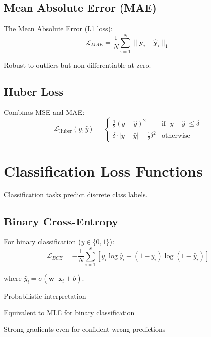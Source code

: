 \subsection{Mean Absolute Error (MAE)}

The Mean Absolute Error (L1 loss):
\begin{equation}
\mathcal{L}_{MAE} = \frac{1}{N}\sum_{i=1}^{N} \|\mathbf{y}_i - \hat{\mathbf{y}}_i\|_1
\end{equation}

Robust to outliers but non-differentiable at zero.

\subsection{Huber Loss}

Combines MSE and MAE:
\begin{equation}
\mathcal{L}_{\text{Huber}}(y, \hat{y}) = 
\begin{cases}
\frac{1}{2}(y - \hat{y})^2 & \text{if } |y - \hat{y}| \leq \delta \\
\delta \cdot |y - \hat{y}| - \frac{1}{2}\delta^2 & \text{otherwise}
\end{cases}
\end{equation}

\section{Classification Loss Functions}

Classification tasks predict discrete class labels.

\subsection{Binary Cross-Entropy}

For binary classification ($y \in \{0, 1\}$):
\begin{equation}
\mathcal{L}_{BCE} = -\frac{1}{N}\sum_{i=1}^{N}[y_i \log \hat{y}_i + (1-y_i) \log(1-\hat{y}_i)]
\end{equation}

where $\hat{y}_i = \sigma(\mathbf{w}^\top \mathbf{x}_i + b)$.

\begin{advantages}
    \item Probabilistic interpretation
    \item Equivalent to MLE for binary classification
    \item Strong gradients even for confident wrong predictions
\end{advantages}

